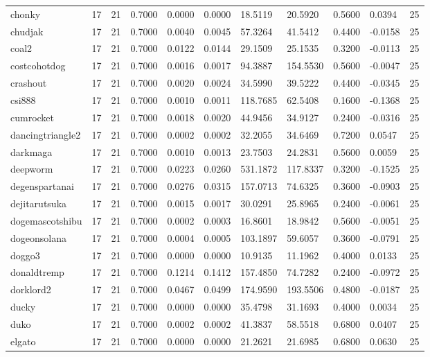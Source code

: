 \begin{table}[htbp]
\begin{tabular}{lllllllllll}
chonky & 17 & 21 & 0.7000 & 0.0000 & 0.0000 & 18.5119 & 20.5920 & 0.5600 & 0.0394 & 25 \\
chudjak & 17 & 21 & 0.7000 & 0.0040 & 0.0045 & 57.3264 & 41.5412 & 0.4400 & -0.0158 & 25 \\
coal2 & 17 & 21 & 0.7000 & 0.0122 & 0.0144 & 29.1509 & 25.1535 & 0.3200 & -0.0113 & 25 \\
costcohotdog & 17 & 21 & 0.7000 & 0.0016 & 0.0017 & 94.3887 & 154.5530 & 0.5600 & -0.0047 & 25 \\
crashout & 17 & 21 & 0.7000 & 0.0020 & 0.0024 & 34.5990 & 39.5222 & 0.4400 & -0.0345 & 25 \\
csi888 & 17 & 21 & 0.7000 & 0.0010 & 0.0011 & 118.7685 & 62.5408 & 0.1600 & -0.1368 & 25 \\
cumrocket & 17 & 21 & 0.7000 & 0.0018 & 0.0020 & 44.9456 & 34.9127 & 0.2400 & -0.0316 & 25 \\
dancingtriangle2 & 17 & 21 & 0.7000 & 0.0002 & 0.0002 & 32.2055 & 34.6469 & 0.7200 & 0.0547 & 25 \\
darkmaga & 17 & 21 & 0.7000 & 0.0010 & 0.0013 & 23.7503 & 24.2831 & 0.5600 & 0.0059 & 25 \\
deepworm & 17 & 21 & 0.7000 & 0.0223 & 0.0260 & 531.1872 & 117.8337 & 0.3200 & -0.1525 & 25 \\
degenspartanai & 17 & 21 & 0.7000 & 0.0276 & 0.0315 & 157.0713 & 74.6325 & 0.3600 & -0.0903 & 25 \\
dejitarutsuka & 17 & 21 & 0.7000 & 0.0015 & 0.0017 & 30.0291 & 25.8965 & 0.2400 & -0.0061 & 25 \\
dogemascotshibu & 17 & 21 & 0.7000 & 0.0002 & 0.0003 & 16.8601 & 18.9842 & 0.5600 & -0.0051 & 25 \\
dogeonsolana & 17 & 21 & 0.7000 & 0.0004 & 0.0005 & 103.1897 & 59.6057 & 0.3600 & -0.0791 & 25 \\
doggo3 & 17 & 21 & 0.7000 & 0.0000 & 0.0000 & 10.9135 & 11.1962 & 0.4000 & 0.0133 & 25 \\
donaldtremp & 17 & 21 & 0.7000 & 0.1214 & 0.1412 & 157.4850 & 74.7282 & 0.2400 & -0.0972 & 25 \\
dorklord2 & 17 & 21 & 0.7000 & 0.0467 & 0.0499 & 174.9590 & 193.5506 & 0.4800 & -0.0187 & 25 \\
ducky & 17 & 21 & 0.7000 & 0.0000 & 0.0000 & 35.4798 & 31.1693 & 0.4000 & 0.0034 & 25 \\
duko & 17 & 21 & 0.7000 & 0.0002 & 0.0002 & 41.3837 & 58.5518 & 0.6800 & 0.0407 & 25 \\
elgato & 17 & 21 & 0.7000 & 0.0000 & 0.0000 & 21.2621 & 21.6985 & 0.6800 & 0.0630 & 25 \\

\end{tabular}
\end{table}
